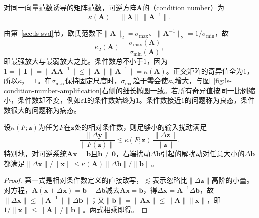 \begin{definition}[可逆矩阵的条件数]
\label{def:matrix-analysis-condition-number}
对同一向量范数诱导的矩阵范数，可逆方阵$\bm A$的（condition number）为
\begin{equation}
 \kappa(\bm A)=\lVert\bm A\rVert\,\lVert\bm A^{-1}\rVert .
 \label{eq:matrix-analysis-condition-number}
\end{equation}
\end{definition}
由第~\ref{sec:ls-svd}节，欧氏范数下$\lVert\bm A\rVert_2=\sigma_{\max}$、$\lVert\bm A^{-1}\rVert_2=1/\sigma_{\min}$，故
\begin{equation}
 \kappa_2(\bm A)=\frac{\sigma_{\max}(\bm A)}{\sigma_{\min}(\bm A)},
 \label{eq:matrix-analysis-spectral-condition-number}
\end{equation}
即最强放大与最弱放大之比。条件数总不小于$1$，因为$1=\lVert\bm I\rVert=\lVert\bm A\bm A^{-1}\rVert\leq\lVert\bm A\rVert\lVert\bm A^{-1}\rVert=\kappa(\bm A)$。正交矩阵的奇异值全为$1$，所以$\kappa_2=1$。在$\sigma_{\max}$保持固定尺度时，$\sigma_{\min}$趋于零会使$\kappa_2$增大，与图~\ref{fig:ls-condition-number-amplification}右侧的细长椭圆一致。若所有奇异值按同一比例缩小，条件数却不变，例如$\varepsilon\bm I$的条件数始终为$1$。条件数接近$1$的问题称为良态，条件数很大的问题称为病态。

\begin{theorem}[条件数基本界]
\label{thm:matrix-analysis-condition-number-bound}
设$\kappa(F;\bm z)$为任务$F$在$\bm z$处的相对条件数，则足够小的输入扰动满足
\begin{equation}
 \frac{\lVert\Delta\bm y\rVert}{\lVert F(\bm z)\rVert}
 \lesssim\kappa(F;\bm z)\,\frac{\lVert\Delta\bm z\rVert}{\lVert\bm z\rVert}.
 \label{eq:matrix-analysis-condition-number-bound}
\end{equation}
特别地，对可逆系统$\bm A\bm x=\bm b$且$\bm b\neq\bm0$，右端扰动$\Delta\bm b$引起的解扰动对任意大小的$\Delta\bm b$都满足$\lVert\Delta\bm x\rVert/\lVert\bm x\rVert\leq\kappa(\bm A)\lVert\Delta\bm b\rVert/\lVert\bm b\rVert$。
\end{theorem}
\begin{proof}
第一式是相对条件数定义的直接改写，$\lesssim$表示忽略比$\lVert\Delta\bm z\rVert$高阶的小量。对方程，$\bm A(\bm x+\Delta\bm x)=\bm b+\Delta\bm b$减去$\bm A\bm x=\bm b$，得$\Delta\bm x=\bm A^{-1}\Delta\bm b$，故$\lVert\Delta\bm x\rVert\leq\lVert\bm A^{-1}\rVert\lVert\Delta\bm b\rVert$；又$\lVert\bm b\rVert=\lVert\bm A\bm x\rVert\leq\lVert\bm A\rVert\lVert\bm x\rVert$，即$1/\lVert\bm x\rVert\leq\lVert\bm A\rVert/\lVert\bm b\rVert$。两式相乘即得。
\end{proof}

